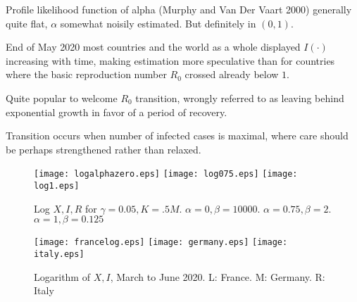 \documentclass{article}
\begin{document}
\bigskip

\noindent Profile likelihood function of alpha (Murphy and Van Der Vaart 2000) generally quite flat, $\alpha$ somewhat noisily estimated. But definitely in $(0,1)$.

\bigskip

\noindent End of May 2020 most countries and the world as a whole displayed $I(\cdot)$ increasing with time, making estimation more speculative than for countries where the basic reproduction number $R_0$ crossed already below $1$.

\bigskip

\noindent Quite popular to welcome $R_0$ transition, wrongly referred to as leaving behind exponential growth in favor of a period of recovery.

\bigskip

\noindent Transition occurs when number of infected cases is maximal, where care should be perhaps strengthened rather than relaxed.


\newpage

\begin{figure}
	\begin{center}
	{\texttt{[image: logalphazero.eps]}}
	\qquad
	{\texttt{[image: log075.eps]}}
	\qquad
	{\texttt{[image: log1.eps]}}
	\end{center}
	\caption{Log $X, I, R$ for $\gamma=0.05 , K=.5M$. $\alpha=0 , \beta=10000$. $\alpha=0.75 , \beta=2$. $\alpha=1 , \beta=0.125$}
\end{figure}

\bigskip

\begin{figure}
\begin{center}
{\texttt{[image: francelog.eps]}}
 \qquad
{\texttt{[image: germany.eps]}}
 \qquad
{\texttt{[image: italy.eps]}}
\end{center}
\caption{Logarithm of $X, I$, March to June 2020. L: France. M: Germany. R: Italy}
\end{figure}
\end{document}
